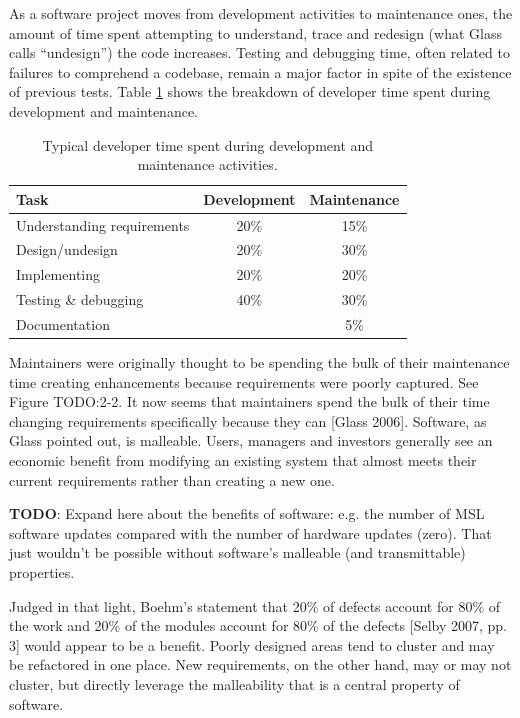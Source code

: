 As a software project moves from development activities to maintenance ones, the amount of time spent attempting to understand, trace and redesign (what Glass calls ``undesign'') the code increases.  Testing and debugging time, often related to failures to comprehend a codebase, remain a major factor in spite of the existence of previous tests.  Table \ref{table:2.1} shows the breakdown of developer time spent during development and maintenance.

\begin{table}
    \centering
    \begin{tabular}{| l | c | c |}
    \hline
    \textbf{Task} & \textbf{Development} & \textbf{Maintenance} \\ \hline
    Understanding requirements & 20\% & 15\% \\ \hline
    Design/undesign & 20\% & 30\%  \\ \hline
    Implementing & 20\% & 20\%  \\ \hline
    Testing \& debugging & 40\% & 30\%  \\ \hline
    Documentation & & 5\%  \\ \hline
    \end{tabular}
    \caption[Table caption text]{Typical developer time spent during development and maintenance activities.}
    \label{table:2.1}
\end{table}


Maintainers were originally thought to be spending the bulk of their maintenance time creating enhancements because requirements were poorly captured.  See Figure TODO:2-2. It now seems that maintainers spend the bulk of their time changing requirements specifically because they can [Glass 2006].  Software, as Glass pointed out, is malleable.  Users, managers and investors generally see an economic benefit from modifying an existing system that almost meets their current requirements rather than creating a new one.

\textbf{TODO}: Expand here about the benefits of software: e.g. the number of MSL software updates compared with the number of hardware updates (zero). That just wouldn't be possible without software's malleable (and transmittable) properties.

Judged in that light, Boehm's statement that 20\% of defects account for 80\% of the work and 20\% of the modules account for 80\% of the defects [Selby 2007, pp. 3] would appear to be a benefit.  Poorly designed areas tend to cluster and may be refactored in one place.  New requirements, on the other hand, may or may not cluster, but directly leverage the malleability that is a central property of software.

